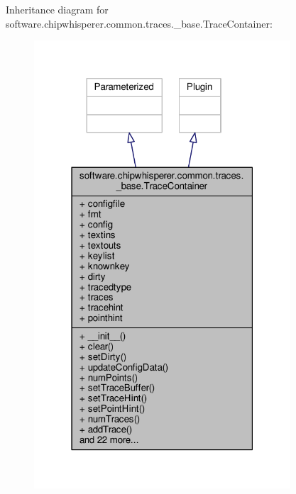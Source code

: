 Inheritance diagram for software.\+chipwhisperer.\+common.\+traces.\+\_\+base.\+Trace\+Container\+:\nopagebreak
\begin{figure}[H]
\begin{center}
\leavevmode
\includegraphics[width=271pt]{d6/d8f/classsoftware_1_1chipwhisperer_1_1common_1_1traces_1_1__base_1_1TraceContainer__inherit__graph}
\end{center}
\end{figure}


